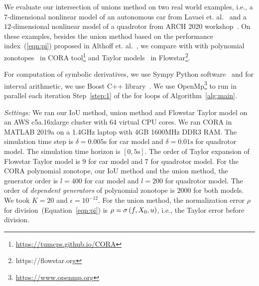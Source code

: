 We evaluate our intersection of unions method on two real world
examples, i.e., a $7$-dimensional nonlinear model of an autonomous car
from Lavaei et. al.~\cite{lavaei2020formal} and a $12$-dimensional
nonlinear model of a quadrotor from ARCH 2020
workshop~\cite{geretti2020arch}.  On these examples, besides the union
method based on the performance index~(\ref{eqn:pi}) proposed in
Althoff et. al.~\cite{althoff2008reachability}, we compare with
with polynomial zonotopes~\cite{althoff2013reachability} in CORA
tool\footnote{\url{https://tumcps.github.io/CORA}} and Taylor
models~\cite{chen2012taylor} in
Flowstar\footnote{https://flowstar.org}.

For computation of symbolic derivatives, we use Sympy Python
software~\cite{10.7717/peerj-cs.103} and for interval arithmetic, we
use Boost C++ library~\cite{bronnimann2006design}.  We use
OpenMp\footnote{\url{https://www.openmp.org}} to run in
parallel each iteration Step~\ref{step:1} of the for loops of
Algorithm~\ref{alg:main}.

\emph{Settings:}  We
ran our IoU method, union method and Flowstar Taylor model on an AWS
c5a.16xlarge cluster with 64 virtual CPU cores.  We ran CORA in MATLAB
2019a on a 1.4GHz laptop with 4GB 1600MHz DDR3 RAM.  The
simulation time step is $\delta = 0.005\si{\second}$ for car model and
$\delta = 0.01\si{\second}$ for quadrotor model.  The simulation time
horizon is $[0, 5\si{\second}]$.  The order of Taylor expansion of
Flowstar Taylor model is $9$ for car model and $7$ for quadrotor
model.  For the CORA polynomial zonotope, our IoU method and the union
method, the generator order is $l=400$ for car model and $l=200$ for
quadrotor model.  The order of \emph{dependent generators} of
polynomial zonotope is $2000$ for both models.  We took $K = 20$ and
$\epsilon = 10^{-12}$.  For the union method, the normalization error
$\rho$ for division~(Equation~\ref{eqn:pi}) is $\rho
= \sigma\left(f,X_0,u\right)$, i.e., the Taylor error before division.


